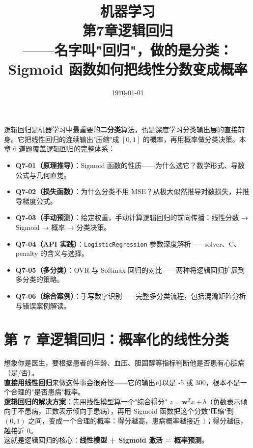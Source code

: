 \documentclass[a4paper,11pt]{ctexart}
\title{\textbf{机器学习\\第7章\quad 逻辑回归}\\[0.5em]
{\large\color{gray}——名字叫"回归"，做的是分类：Sigmoid 函数如何把线性分数变成概率}}
\date{\today}
\begin{document}
\maketitle

\begin{beginnerbox}
    逻辑回归是机器学习中最重要的\textbf{二分类}算法，也是深度学习分类输出层的直接前身。它把线性回归的连续输出"压缩"成 $[0,1]$ 的概率，再用概率做分类决策。本章 6 道题覆盖逻辑回归的完整体系：
    \begin{itemize}
        \item \textbf{Q7-01（原理推导）}：Sigmoid 函数的性质——为什么选它？数学形式、导数公式与几何直觉。
        \item \textbf{Q7-02（损失函数）}：为什么分类不用 MSE？从极大似然推导对数损失，并推导梯度公式。
        \item \textbf{Q7-03（手动预测）}：给定权重，手动计算逻辑回归的前向传播：线性分数 → Sigmoid → 概率 → 分类决策。
        \item \textbf{Q7-04（API 实践）}：\texttt{LogisticRegression} 参数深度解析——solver、C、penalty 的含义与选择。
        \item \textbf{Q7-05（多分类）}：OVR 与 Softmax 回归的对比——两种将逻辑回归扩展到多分类的策略。
        \item \textbf{Q7-06（综合案例）}：手写数字识别——完整多分类流程，包括混淆矩阵分析与错误案例解读。
    \end{itemize}
\end{beginnerbox}

\section{第 7 章\quad 逻辑回归：概率化的线性分类}

\begin{metaphorbox}
    想象你是医生，要根据患者的年龄、血压、胆固醇等指标判断他是否患有心脏病（是/否）。\\
    \textbf{直接用线性回归}来做这件事会很奇怪——它的输出可以是 -5 或 300，根本不是一个合理的"是否患病"概率。\\
    \textbf{逻辑回归的解决方案}：先用线性模型算一个"综合得分" $z = \boldsymbol{w}^Tx+b$（负数表示倾向于不患病，正数表示倾向于患病），再用 Sigmoid 函数把这个分数"压缩"到 $(0,1)$ 之间，变成一个合理的概率：得分越高，患病概率越接近 1；得分越低，越接近 0。\\
    这就是逻辑回归的核心：\textbf{线性模型 + Sigmoid 激活 = 概率预测}。
\end{metaphorbox}
\end{document}
